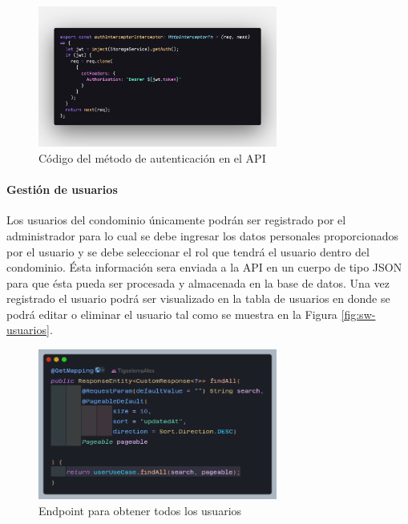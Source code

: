\begin{figure}[H]
    \centering
    \includegraphics[width=0.7\textwidth]{resources/images/sw-interceptor}
    \caption{Código del método de autenticación en el API}
    \label{fig:sw-interceptor}
\end{figure}

\paragraph{Gestión de usuarios}

Los usuarios del condominio únicamente podrán ser registrado por el administrador para lo cual se debe ingresar los datos personales proporcionados por el usuario y se debe seleccionar el rol que tendrá el usuario dentro del condominio.
Ésta información sera enviada a la API en un cuerpo de tipo JSON para que ésta pueda ser procesada y almacenada en la base de datos.
Una vez registrado el usuario podrá ser visualizado en la tabla de usuarios en donde se podrá editar o eliminar el usuario tal como se muestra en la Figura \ref{fig:sw-usuarios}.

\begin{figure}[H]
    \centering
    \includegraphics[width=0.7\textwidth]{resources/images/api-controller-findall}
    \caption{Endpoint para obtener todos los usuarios}
    \label{fig:api-findAll-controller}
\end{figure}

